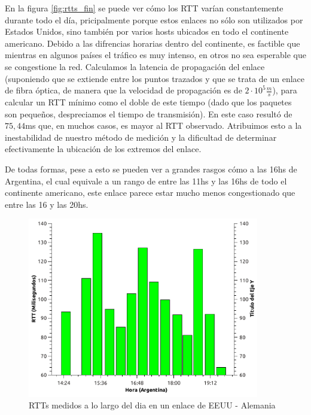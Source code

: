 
En la figura \ref{fig:rtts_fin} se puede ver cómo los RTT varían constantemente durante todo el día, pricipalmente porque estos enlaces no sólo son utilizados por Estados Unidos, sino también por varios hosts ubicados en todo el continente americano. Debido a las difrencias horarias dentro del continente, es factible que mientras en algunos países el tráfico es muy intenso, en otros no sea esperable que se congestione la red. Calculamos la latencia de propagación del enlace (suponiendo que se extiende entre los puntos trazados y que se trata de un enlace de fibra óptica, de manera que la velocidad de propagación es de $2\cdot 10^{5}\frac{m}{s}$), para calcular un RTT mínimo como el doble de este tiempo (dado que los paquetes son pequeños, despreciamos el tiempo de transmisión). En este caso resultó de $75,44$ms que, en muchos casos, es mayor al RTT observado. Atribuimos esto a la inestabilidad de nuestro método de medición y la dificultad de determinar efectivamente la ubicación de los extremos del enlace.

De todas formas, pese a esto se pueden ver a grandes rasgos cómo a las 16hs de Argentina, el cual equivale a un rango de entre las 11hs y las 16hs de todo el continente americano, este enlace parece estar mucho menos congestionado que entre las 16 y las 20hs. 



\begin{figure}[H]
  \centering
    \includegraphics[width=0.9\textwidth]{graficos/rtts_dia_inglaterra.pdf}
    \caption{RTTs medidos a lo largo del dia en un enlace de EEUU - Alemania}
    \label{fig:rtts_ing}
\end{figure}

